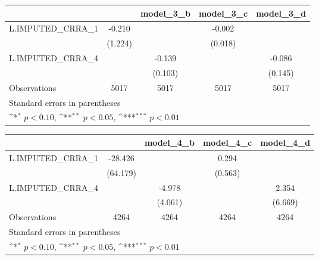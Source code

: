 {
\def\sym#1{\ifmmode^{#1}\else\(^{#1}\)\fi}
\begin{tabular}{l*{4}{c}}
\toprule
                &\multicolumn{1}{c}{}&\multicolumn{1}{c}{model\_3\_b}&\multicolumn{1}{c}{model\_3\_c}&\multicolumn{1}{c}{model\_3\_d}\\
\midrule
L.IMPUTED\_CRRA\_1&   -0.210         &                  &   -0.002         &                  \\
                &  (1.224)         &                  &  (0.018)         &                  \\
\addlinespace
L.IMPUTED\_CRRA\_4&                  &   -0.139         &                  &   -0.086         \\
                &                  &  (0.103)         &                  &  (0.145)         \\
\midrule
Observations    &     5017         &     5017         &     5017         &     5017         \\
\bottomrule
\multicolumn{5}{l}{\footnotesize Standard errors in parentheses}\\
\multicolumn{5}{l}{\footnotesize \sym{*} \(p<0.10\), \sym{**} \(p<0.05\), \sym{***} \(p<0.01\)}\\
\end{tabular}
}
{
\def\sym#1{\ifmmode^{#1}\else\(^{#1}\)\fi}
\begin{tabular}{l*{4}{c}}
\toprule
                &\multicolumn{1}{c}{}&\multicolumn{1}{c}{model\_4\_b}&\multicolumn{1}{c}{model\_4\_c}&\multicolumn{1}{c}{model\_4\_d}\\
\midrule
L.IMPUTED\_CRRA\_1&  -28.426         &                  &    0.294         &                  \\
                & (64.179)         &                  &  (0.563)         &                  \\
\addlinespace
L.IMPUTED\_CRRA\_4&                  &   -4.978         &                  &    2.354         \\
                &                  &  (4.061)         &                  &  (6.669)         \\
\midrule
Observations    &     4264         &     4264         &     4264         &     4264         \\
\bottomrule
\multicolumn{5}{l}{\footnotesize Standard errors in parentheses}\\
\multicolumn{5}{l}{\footnotesize \sym{*} \(p<0.10\), \sym{**} \(p<0.05\), \sym{***} \(p<0.01\)}\\
\end{tabular}
}
